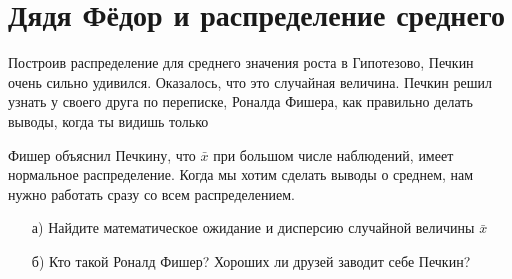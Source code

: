 \documentclass[12pt, a4paper, oneside]{article}
\begin{document}
\section{Дядя Фёдор и распределение среднего}

Построив распределение для среднего значения роста в Гипотезово, Печкин очень сильно удивился. Оказалось, что это случайная величина. Печкин решил узнать у своего друга по переписке, Роналда Фишера, как правильно делать выводы, когда ты видишь только 

Фишер объяснил Печкину, что $\bar x$ при большом числе наблюдений, имеет нормальное распределение. Когда мы хотим сделать выводы о среднем, нам нужно работать сразу со всем распределением. 

\begin{enumerate}
    \item[а)] Найдите математическое ожидание и дисперсию случайной величины $\bar{x}$
	\item[б)] Кто такой Роналд Фишер? Хороших ли друзей заводит себе Печкин?
\end{enumerate}
\end{document}

